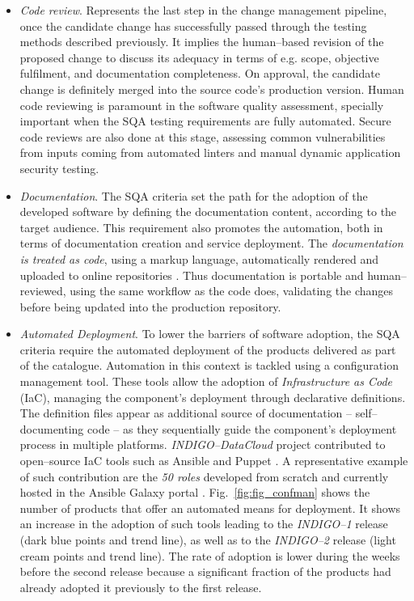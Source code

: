 \documentclass[journal]{IEEEtran}
\begin{document}
\begin{itemize}
\item \textit{Code review}.
Represents the last step in the change management pipeline, once the candidate change has
successfully passed through the testing methods described previously. It implies the human--based
revision of the proposed change to discuss its adequacy in terms of e.g. scope, objective fulfilment,
and documentation completeness. On approval, the candidate change is definitely merged into
the source code's production version. Human code reviewing is paramount in the software quality assessment, specially
important when the SQA testing requirements are fully automated. Secure code reviews are also
done at this stage, assessing common vulnerabilities from inputs coming from automated linters
and manual dynamic application security testing.

\item \textit{Documentation}.
The SQA criteria set the path for the adoption of the developed software by
defining the documentation content, according to the target audience. This requirement also
promotes the automation, both in terms of documentation creation and service deployment. The
\textit{documentation is treated as code}, using a markup language, automatically rendered and
uploaded to online repositories \cite{indigo-gitbook}. Thus documentation is portable and
human--reviewed, using the same workflow as the code does, validating the changes before being
updated into the production repository.

\item \textit{Automated Deployment}.
To lower the barriers of software adoption, the SQA criteria require the automated
deployment of the products delivered as part of the catalogue. Automation in this context is
tackled using a configuration management tool. These tools allow the adoption of
\textit{Infrastructure as Code} (IaC), managing the component's deployment through declarative
definitions. The definition files appear as additional source of documentation
-- self--documenting code -- as they sequentially guide the component's deployment process in multiple
platforms. {\sl INDIGO--DataCloud} project contributed to open--source IaC tools such
as Ansible \cite{indigo-galaxy} and Puppet \cite{indigo-puppet}. A representative example of
such contribution are the \textit{50 roles} developed from scratch and currently hosted in
the Ansible Galaxy portal \cite{indigo-galaxy}. Fig.~\ref{fig:fig_confman}
shows the number of products that offer an automated means for deployment.
It shows an increase in the adoption of such tools leading to the {\sl INDIGO--1} release
(dark blue points and trend line), as well as to the {\sl INDIGO--2} release
(light cream points and trend line). The rate of adoption is lower during the weeks
before the second release because a significant fraction of the products had already adopted it
previously to the first release.
\end{itemize}
\end{document}
